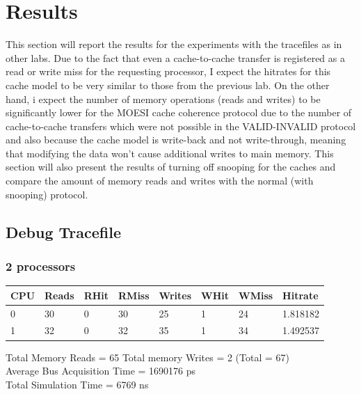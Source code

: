 \documentclass[]{article}
\begin{document}
\section{Results}

This section will report the results for the experiments with the tracefiles as in other labs. Due to the fact that even a cache-to-cache transfer is registered as a read or write miss for the requesting processor, I expect the hitrates for this cache model to be very similar to those from the previous lab. On the other hand, i expect the number of memory operations (reads and writes) to be significantly lower for the MOESI cache coherence protocol due to the number of cache-to-cache transfers which were not possible in the VALID-INVALID protocol and also because the cache model is write-back and not write-through, meaning that modifying the data won't cause additional writes to main memory. This section will also present the results of turning off snooping for the caches and compare the amount of memory reads and writes with the normal (with snooping) protocol.


\subsection{Debug Tracefile}

\subsubsection{2 processors}

\begin{table}[H]
	\begin{tabular}{|l|l|l|l|l|l|l|l|}
		\hline
		\textbf{CPU} & \textbf{Reads} & \textbf{RHit} & \textbf{RMiss} & \textbf{Writes} & \textbf{WHit} & \textbf{WMiss} & \textbf{Hitrate} \\ \hline
		0            & 30             & 0             & 30             & 25              & 1             & 24             & 1.818182         \\ \hline
		1            & 32             & 0             & 32             & 35              & 1             & 34             & 1.492537         \\ \hline
	\end{tabular}
\end{table}

Total Memory Reads = 65 Total memory Writes = 2 (Total = 67)\\
Average Bus Acquisition Time = 1690176 ps\\
Total Simulation Time = 6769 ns 
\end{document}
